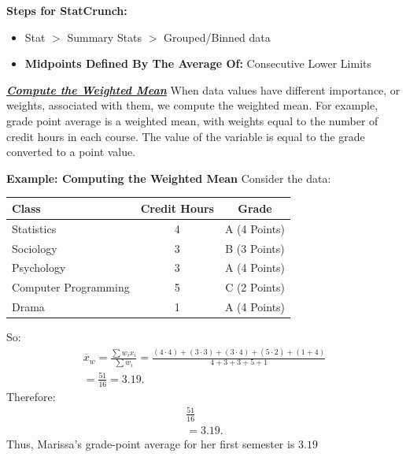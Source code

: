 \documentclass{report}
\begin{document}
         \bigbreak \noindent 
         \textbf{Steps for StatCrunch:}
         \begin{itemize}
             \item Stat $>$ Summary Stats $>$ Grouped/Binned data
            \item \textbf{Midpoints Defined By The Average Of:} \rightarrow Consecutive Lower Limits

         \end{itemize}

         \bigbreak \noindent \bigbreak \noindent 
         \textbf{\textit{\underline{Compute the Weighted Mean}}}
         \bigbreak \noindent 
         When data values have different importance, or weights, associated with them, we compute the weighted mean. For example, grade point average is a weighted mean, with weights equal to the number of credit hours in each course. The value of the variable is equal to the grade converted to a point value. 
         \bigbreak \noindent 
         \begin{mdframed}
           \textbf{Example: Computing the Weighted Mean}
           \bigbreak \noindent 
           Consider the data:
           \begin{center}
               \begin{center}
                   \begin{tabular}{|l|c|c|}
                   \hline
                   Class & Credit Hours & Grade \\
                   	\hline
                   Statistics & 4 	  & A (4 Points) \\
                   	\hline
                   Sociology & 3 & B (3 Points) \\
                   	\hline
                   Psychology & 3 & A (4 Points) \\
                   	\hline
                   Computer Programming & 5 & C (2 Points) \\
                   \hline
                   Drama & 1 & A (4 Points) \\
                   \hline
                   \end{tabular}
               \end{center}
           \end{center}
           \bigbreak \noindent 
           So:
           \begin{align*}
               \overline{x}_{w} = \frac{\sum w_{i}x_{i}}{\sum w_{i}} = \frac{(4\cdot 4) + ( 3\cdot 3) +  (3 \cdot 4) + (5 \cdot 2) + (1 + 4) }{4 + 3 + 3 + 5 + 1} \\
               = \frac{51}{16} =3.19
           .\end{align*}
           \bigbreak \noindent 
           Therefore:
           \begin{align*}
               \frac{51}{16} \\
               = 3.19
           .\end{align*}
           \bigbreak \noindent 
           Thus, Marissa's grade-point average for her first semester is $3.19 $
           
         \end{mdframed}
\end{document}
